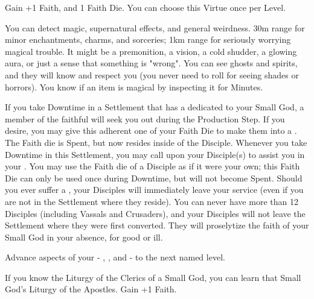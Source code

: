 \begin{multicols*}{2}


Gain +1 \MAX Faith, and 1 Faith Die. You can choose this Virtue once per Level.



You can detect magic, supernatural effects, and general weirdness. 30m range for minor enchantments, charms, and sorceries; 1km range for seriously worrying magical trouble. It might be a premonition, a vision, a cold shudder, a glowing aura, or just a sense that something is "wrong". You can see ghosts and spirits, and they will know and respect you (you never need to roll \INSANITY for seeing shades or horrors). You know if an item is magical by inspecting it for Minutes.


If you take Downtime in a Settlement that has a  dedicated to your Small God, a member of the faithful will seek you out during the Production Step.  If you desire, you may give this adherent one of your Faith Die to make them into a . The Faith die is Spent, but now resides inside of the Disciple.  Whenever you take Downtime in this Settlement, you may call upon your Disciple(s) to assist you in your . You may use the Faith die of a Disciple as if it were your own; this Faith Die can only be used once during Downtime, but will not become Spent. Should you ever suffer a , your Disciples will immediately leave your service (even if you are not in the Settlement where they reside). You can never have more than 12 Disciples (including Vassals and Crusaders), and your Disciples will not leave the Settlement where they were first converted. They will proselytize the faith of your Small God in your absence, for good or ill.


Advance  aspects of your  - \DEATH, \INJURY, and \INSANITY - to the next named level.


If you know the Liturgy of the Clerics of a Small God, you can learn that Small God's Liturgy of the Apostles. Gain +1 \MAX Faith.


\end{multicols*}
